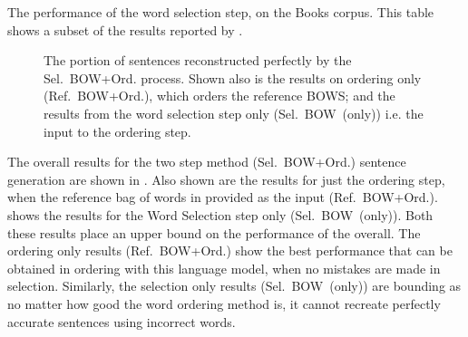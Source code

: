 \documentclass[11pt]{article}
\theoremstyle{plain}
\theoremstyle{definition}
\newcommand{\textcite}{\protect\newcite}
\newcommand{\oracletitle}{Ref.~BOW+Ord.}
\newcommand{\selectiontitle}{Sel.~BOW~(only)}
\newcommand{\twosteptitle}{Sel.~BOW+Ord.}
\begin{document}
\begin{table}	
	\centering
	\caption{ The performance of the word selection step, on the Books corpus. This table shows a subset of the results reported by \textcite{White2015BOWgen}.}
	\label{table:wordselection}
\end{table}


\begin{figure}
	\centering
	 {\ordlenscoresoracle}
	\caption{The portion of sentences reconstructed perfectly by the \twosteptitle{} process. Shown also is the results on ordering only (\oracletitle{}), which orders the reference BOWS; and the results from the word selection step only (\selectiontitle{}) i.e. the input to the ordering step.}
	\label{figure:exactlenscore}
\end{figure}




The overall results for the two step method (\twosteptitle{}) sentence generation are shown in . Also shown are the results for just the ordering step, when the reference bag of words in provided as the input (\oracletitle{}).  shows the results for the Word Selection step only (\selectiontitle{}). Both these results place an upper bound on the performance of the overall. The ordering only results (\oracletitle{}) show the best performance that can be obtained in ordering with this language model, when no mistakes are made in selection. Similarly, the selection only results (\selectiontitle{}) are bounding as no matter how good the word ordering method is, it cannot recreate perfectly accurate sentences using incorrect words.
\end{document}
